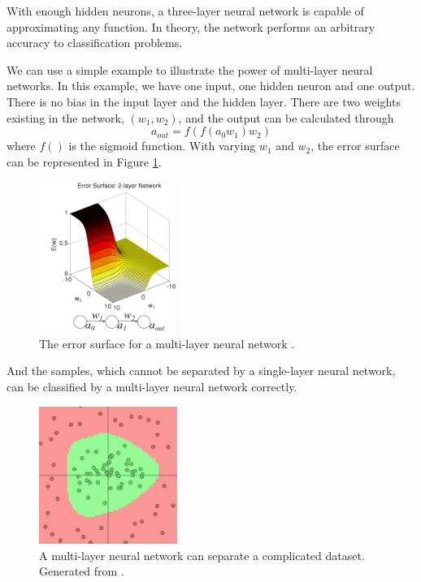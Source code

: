 With enough hidden neurons, a three-layer neural network is capable of approximating any function. In theory, the network performs an arbitrary accuracy to classification problems.

We can use a simple example to illustrate the power of multi-layer neural networks. In this example, we have one input, one hidden neuron and one output. There is no bias in the input layer and the hidden layer. There are two weights existing in the network, $(w_{1}, w_{2})$, and the output can be calculated through
\begin{equation}\label{eq:2LayerExample}
a_{out} = f(f(a_{0}w_{1})w_{2})
\end{equation}
where $f()$ is the sigmoid function. With varying $w_{1}$ and $w_{2}$, the error surface can be represented in Figure \ref{fig:2LayerErrorSurface}.
\graphicspath{ {./Figures/} }
\begin{figure}[!htb]
\centering
\includegraphics[width=0.4\textwidth]{2LayerErrorSurface.png}
\caption{\label{fig:2LayerErrorSurface}The error surface for a multi-layer neural network \citep{ErrorFigure1}.}
\end{figure}
And the samples, which cannot be separated by a single-layer neural network, can be classified by a multi-layer neural network correctly.
\graphicspath{ {./Figures/} }
\begin{figure}[!htb]
\centering
\includegraphics[width=0.4\textwidth]{MultiLayerCircleData.png}
\caption{\label{fig:MultiLayerErrorSurface}A multi-layer neural network can separate a complicated dataset. Generated from \citep{GenerateNN}.}
\end{figure}

